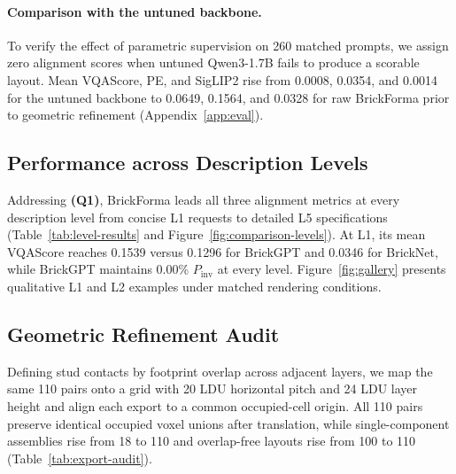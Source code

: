 \documentclass[letterpaper]{article} %
\begin{document}
\paragraph{Comparison with the untuned backbone.}
To verify the effect of parametric supervision on 260 matched prompts, we assign zero alignment scores when untuned Qwen3-1.7B fails to produce a scorable layout. Mean VQAScore, PE, and SigLIP2 rise from 0.0008, 0.0354, and 0.0014 for the untuned backbone to 0.0649, 0.1564, and 0.0328 for raw BrickForma prior to geometric refinement (Appendix~\ref{app:eval}).

\subsection{Performance across Description Levels}

Addressing \textbf{(Q1)}, BrickForma leads all three alignment metrics at every description level from concise L1 requests to detailed L5 specifications (Table~\ref{tab:level-results} and Figure~\ref{fig:comparison-levels}). At L1, its mean VQAScore reaches 0.1539 versus 0.1296 for BrickGPT and 0.0346 for BrickNet, while BrickGPT maintains 0.00\% $P_{\mathrm{inv}}$ at every level. Figure~\ref{fig:gallery} presents qualitative L1 and L2 examples under matched rendering conditions.



% 

\subsection{Geometric Refinement Audit}
\label{sec:diagnostics}
Defining stud contacts by footprint overlap across adjacent layers, we map the same 110 pairs onto a grid with 20 LDU horizontal pitch and 24 LDU layer height and align each export to a common occupied-cell origin. All 110 pairs preserve identical occupied voxel unions after translation, while single-component assemblies rise from 18 to 110 and overlap-free layouts rise from 100 to 110 (Table~\ref{tab:export-audit}).

\end{document}
